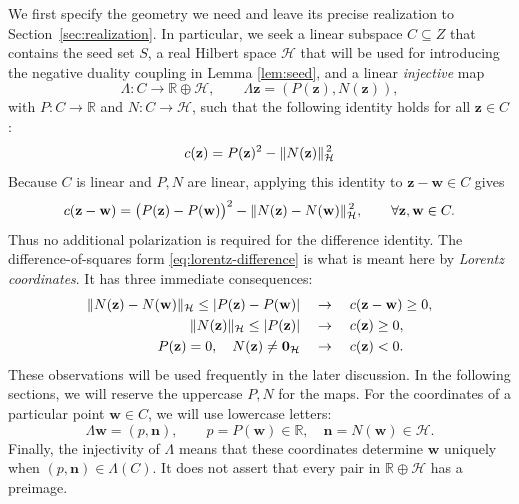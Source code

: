 \documentclass[11pt,a4paper]{article}
\theoremstyle{reportstyle}
\numberwithin{equation}{section}
\newcommand{\R}{\mathbb R}
\newcommand{\HH}{\mathcal H}
\newcommand{\bn}{\mathbf n}
\newcommand{\bz}{\mathbf z}
\newcommand{\bw}{\mathbf w}
\newcommand{\bzero}{\mathbf 0}
\DeclarePairedDelimiter{\norm}{\lVert}{\rVert}
\DeclarePairedDelimiter{\abs}{\lvert}{\rvert}
\begin{document}
	We first specify the geometry we need and leave its precise realization to
	Section~\ref{sec:realization}. In particular, we seek a linear subspace $C\subseteq Z$ that contains the seed set $S$, a
	real Hilbert space $\HH$ that will be used for introducing the negative duality coupling in Lemma \ref{lem:seed}, and a linear \emph{injective} map
	\begin{equation}
		\label{eq:Lambda}
		\Lambda:C\rightarrow\R\oplus\HH, \qquad \Lambda \bz=(P(\bz),N(\bz)),
	\end{equation}
	with $P:C\to\R$ and $N:C\to\HH$, such that the following identity holds for all $\bz\in C$:
	\begin{equation}
		c(\bz)=P(\bz)^2-\norm{N(\bz)}_{\HH}^{\,2}
		\label{eq:framework-energy}
	\end{equation}
	Because $C$ is linear and $P,N$ are linear, applying this identity to
	$\bz-\bw\in C$ gives
	\begin{equation}
		c(\bz-\bw)=\bigl(P(\bz)-P(\bw)\bigr)^2
		-\norm{N(\bz)-N(\bw)}_{\HH}^{\,2},
		\qquad\forall \bz,\bw\in C.
		\label{eq:lorentz-difference}
	\end{equation}
	Thus no additional polarization is required for the difference identity. The difference-of-squares form \eqref{eq:lorentz-difference} is what is meant here by \emph{Lorentz 	coordinates}. It has three immediate consequences:
	\begin{align*}
		\norm{N(\bz)-N(\bw)}_{\HH}\le\abs{P(\bz)-P(\bw)}
		&\quad\rightarrow\quad c(\bz-\bw)\ge0,\\
		\norm{N(\bz)}_{\HH}\le\abs{P(\bz)}
		&\quad\rightarrow\quad c(\bz)\ge0,\\
		P(\bz)=0,\quad N(\bz)\ne\bzero_{\HH}
		&\quad\rightarrow\quad c(\bz)<0.
	\end{align*}
	These observations will be used frequently in the later discussion. In the following sections, we will reserve the uppercase $P,N$ for the maps. For the coordinates of a
	particular point $\bw\in C$, we will use lowercase letters:
	\begin{equation*}
		\Lambda \bw=(p,\bn),\qquad p=P(\bw)\in\R,\quad\bn=N(\bw)\in\HH.
	\end{equation*}
	Finally, the injectivity of $\Lambda$ means that these coordinates determine $\bw$ uniquely when
	$(p,\bn)\in\Lambda(C)$. It does not assert that every pair in
	$\R\oplus\HH$ has a preimage.
\end{document}

